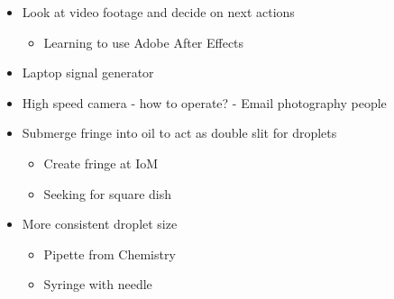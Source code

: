 \begin{itemize}
\item Look at video footage and decide on next actions

\begin{itemize}
\item Learning to use Adobe After Effects
\end{itemize}
\item Laptop signal generator
\item High speed camera - how to operate? - Email photography people
\item Submerge fringe into oil to act as double slit for droplets

\begin{itemize}
\item Create fringe at IoM
\item Seeking for square dish
\end{itemize}
\item More consistent droplet size

\begin{itemize}
\item Pipette from Chemistry
\item Syringe with needle
\end{itemize}
\end{itemize}
